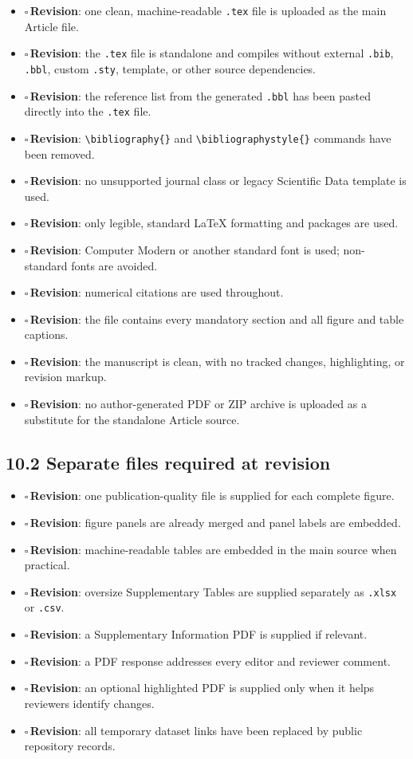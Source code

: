 \documentclass[11pt]{article}
\newcommand{\cbox}{$\square$\,}
\newcommand{\revision}{\textcolor{violet!75!black}{\textbf{Revision}}}
\begin{document}
\begin{itemize}
    \item \cbox \revision: one clean, machine-readable \texttt{.tex} file is uploaded as the main Article file.
    \item \cbox \revision: the \texttt{.tex} file is standalone and compiles without external \texttt{.bib}, \texttt{.bbl}, custom \texttt{.sty}, template, or other source dependencies.
    \item \cbox \revision: the reference list from the generated \texttt{.bbl} has been pasted directly into the \texttt{.tex} file.
    \item \cbox \revision: \texttt{\textbackslash bibliography\{\}} and \texttt{\textbackslash bibliographystyle\{\}} commands have been removed.
    \item \cbox \revision: no unsupported journal class or legacy Scientific Data template is used.
    \item \cbox \revision: only legible, standard LaTeX formatting and packages are used.
    \item \cbox \revision: Computer Modern or another standard font is used; non-standard fonts are avoided.
    \item \cbox \revision: numerical citations are used throughout.
    \item \cbox \revision: the file contains every mandatory section and all figure and table captions.
    \item \cbox \revision: the manuscript is clean, with no tracked changes, highlighting, or revision markup.
    \item \cbox \revision: no author-generated PDF or ZIP archive is uploaded as a substitute for the standalone Article source.
\end{itemize}

\subsection*{10.2 Separate files required at revision}

\begin{itemize}
    \item \cbox \revision: one publication-quality file is supplied for each complete figure.
    \item \cbox \revision: figure panels are already merged and panel labels are embedded.
    \item \cbox \revision: machine-readable tables are embedded in the main source when practical.
    \item \cbox \revision: oversize Supplementary Tables are supplied separately as \texttt{.xlsx} or \texttt{.csv}.
    \item \cbox \revision: a Supplementary Information PDF is supplied if relevant.
    \item \cbox \revision: a PDF response addresses every editor and reviewer comment.
    \item \cbox \revision: an optional highlighted PDF is supplied only when it helps reviewers identify changes.
    \item \cbox \revision: all temporary dataset links have been replaced by public repository records.
\end{itemize}
\end{document}
